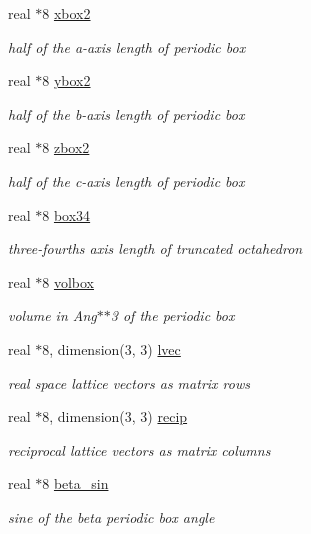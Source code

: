\begin{DoxyCompactItemize}
real $\ast$8 \hyperlink{classboxes_a41afebf3094fba2eaec4f035140fc3ac}{xbox2}
\begin{DoxyCompactList}\small\item\em half of the a-\/axis length of periodic box \end{DoxyCompactList}\item 
real $\ast$8 \hyperlink{classboxes_a88205d54fca966a21525295d45d0bf87}{ybox2}
\begin{DoxyCompactList}\small\item\em half of the b-\/axis length of periodic box \end{DoxyCompactList}\item 
real $\ast$8 \hyperlink{classboxes_afee188c0e895d2a9ba865dff4f81dcc5}{zbox2}
\begin{DoxyCompactList}\small\item\em half of the c-\/axis length of periodic box \end{DoxyCompactList}\item 
real $\ast$8 \hyperlink{classboxes_a397afd9820df0a90accac5cb22327e0d}{box34}
\begin{DoxyCompactList}\small\item\em three-\/fourths axis length of truncated octahedron \end{DoxyCompactList}\item 
real $\ast$8 \hyperlink{classboxes_aca6fdacea9feeb56829de94a10b36e4c}{volbox}
\begin{DoxyCompactList}\small\item\em volume in Ang$\ast$$\ast$3 of the periodic box \end{DoxyCompactList}\item 
real $\ast$8, dimension(3, 3) \hyperlink{classboxes_a3594e3020185258991c3e1d4e3875f68}{lvec}
\begin{DoxyCompactList}\small\item\em real space lattice vectors as matrix rows \end{DoxyCompactList}\item 
real $\ast$8, dimension(3, 3) \hyperlink{classboxes_a0c87c5b0b386dcdd53ab94c59b07f5a8}{recip}
\begin{DoxyCompactList}\small\item\em reciprocal lattice vectors as matrix columns \end{DoxyCompactList}\item 
real $\ast$8 \hyperlink{classboxes_ae19ef077f562e95e2055473c08fa5476}{beta\-\_\-sin}
\begin{DoxyCompactList}\small\item\em sine of the beta periodic box angle \end{DoxyCompactList}\item 

\end{DoxyCompactItemize}
